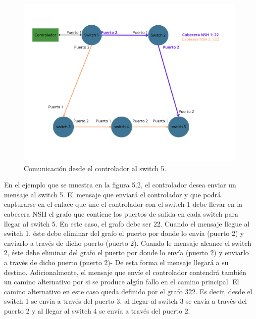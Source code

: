 \documentclass[a4paper, 12pt]{book}
\begin{document}
	\begin{figure}[H]
		\centering
		\includegraphics[width=16cm, keepaspectratio]{img/Ejemplo Periplus 2}
		\caption{Comunicación desde el controlador al switch 5.}
		\label{figura:PeriplusEj2}
	\end{figure}
	
	En el ejemplo que se muestra en la figura 5.2, el controlador desea enviar un mensaje
	al switch 5. El mensaje que enviará el controlador y que podrá capturarse en el enlace que une el
	controlador con el switch 1 debe llevar en la cabecera NSH el grafo que contiene
	los puertos de salida en cada switch para llegar al switch 5. En este caso,
	el grafo debe ser 22. Cuando el mensaje llegue al switch 1, éste debe eliminar del
	grafo el puerto por donde lo envía (puerto 2) y
	enviarlo a través de dicho puerto (puerto 2). Cuando le mensaje alcance el
	switch 2, éste debe eliminar del grafo el puerto por donde lo envía (puerto 2) y enviarlo
	a través de dicho puerto (puerto 2)- De esta forma el mensaje llegará a
	su destino.
	Adicionalmente, el mensaje que envíe el controlador contendrá también un camino alternativo
	por si se produce algún fallo en el camino principal. El camino alternativo en este caso queda
	definido por el grafo 322. Es decir, desde el switch 1 se envía a través del puerto 3, al llegar al
	switch 3 se envía a través del puerto 2 y al llegar al switch 4 se envía a través del puerto 2.
\end{document}
